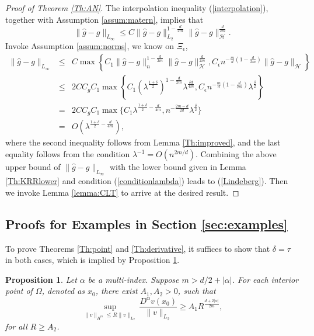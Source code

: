 \documentclass[12pt]{article}
\theoremstyle{plain}
\newtheorem{proposition}{Proposition}
\theoremstyle{remark}
\begin{document}
\begin{proof}[Proof of Theorem \ref{Th:AN}]
    The interpolation inequality (\ref{interpolation}), together with Assumption \ref{assum:matern}, implies that
    \[\|\hat{g}-g\|_{L_\infty}\leq C\|\hat{g}-g\|_{L_2}^{1-\frac{d}{2m}}\|\hat{g}-g\|_{\mathcal{H}}^{\frac{d}{2m}}.\]
    Invoke Assumption \ref{assum:norms}, we know on $\Xi_\epsilon$,
    \begin{eqnarray}
        \|\hat{g}-g\|_{L_\infty}&\leq& C \max\left\{C_1 \|\hat{g}-g\|_n^{1-\frac{d}{2m}}\|\hat{g}-g\|_{\mathcal{H}}^{\frac{d}{2m}}, C_\epsilon n^{-\frac{m}{d}\left(1-\frac{d}{2m}\right)}\|\hat{g}-g\|_{\mathcal{H}}\right\}\nonumber\\
        &\leq& 2 C C_g C_1 \max\left\{C_1(\lambda^{\frac{1+\delta}{2}})^{1-\frac{d}{2m}}\lambda^{\frac{\delta d}{4m}},C_\epsilon n^{-\frac{m}{d}\left(1-\frac{d}{2m}\right)} \lambda^{\frac{\delta}{2}}\right\}\nonumber\\
        &=& 2 C C_g C_1\max\{C_1\lambda^{\frac{1+\delta}{2}-\frac{d}{4m}},n^{-\frac{2m-d}{2d}}\lambda^{\frac{\delta}{2}}\}\nonumber\\
        &=& O(\lambda^{\frac{1+\delta}{2}-\frac{d}{4m}}),\label{deltachoice}
    \end{eqnarray}
    where the second inequality follows from Lemma \ref{Th:improved}, and the last equality follows from the condition $\lambda^{-1}=O(n^{2m/d})$. %
    Combining the above upper bound of $\|\hat{g}-g\|_{L_\infty}$ with the lower bound given in Lemma \ref{Th:KRRlower} and condition (\ref{conditionlambda}) leads to (\ref{Lindeberg}). Then we invoke Lemma \ref{lemma:CLT} to arrive at the desired result.
\end{proof}


\subsection{Proofs for Examples in Section \ref{sec:examples}} \label{sub:example}
To prove Theorems \ref{Th:point} and \ref{Th:derivative}, it suffices to show that $\delta=\tau$ in both cases, which is implied by 
Proposition \ref{Prop:point}.
\begin{proposition}\label{Prop:point}
    Let $\alpha$ be a multi-index. Suppose $m>d/2+|\alpha|$.
    For each interior point of $\Omega$, denoted as $x_0$, there exist $A_1,A_2>0$, such that
    \[\sup_{\|v\|_{H^m}\leq R\|v\|_{L_2}}\frac{D^\alpha v(x_0)}{\|v\|_{L_2}}\geq A_1 R^{\frac{d+2|\alpha|}{2m}},\]
    for all $R\geq A_2$.
\end{proposition}
\end{document}
